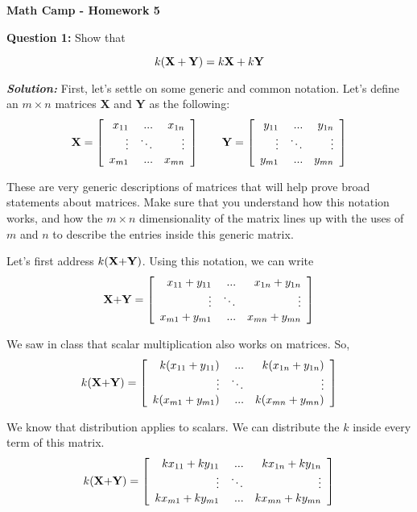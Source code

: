 \documentclass[12pt]{article}
\begin{document}
\centerline{\bf Math Camp - Homework 5}

\bigskip

\textbf{Question 1:} Show that

$$k(\textrm{\textbf{X}} + \textrm{\textbf{Y}}) = k\textrm{\textbf{X}} + k\textrm{\textbf{Y}}$$

\medskip

\textbf{\textit{Solution:}} First, let's settle on some generic and common notation. Let's define an $m\times n$ matrices \textbf{X} and \textbf{Y} as the following:
$$\textrm{\textbf{X}} = \left[\begin{array}{rrr}
x_{11} & ... & x_{1n}\\
\vdots & \ddots & \vdots\\
x_{m1} & ... & x_{mn}\end{array}\right] \qquad \textrm{\textbf{Y}} = \left[\begin{array}{rrr}
y_{11} & ... & y_{1n}\\
\vdots & \ddots & \vdots\\
y_{m1} & ... & y_{mn}\end{array}\right]$$

These are very generic descriptions of matrices that will help prove broad statements about matrices. Make sure that you understand how this notation works, and how the $m\times n$ dimensionality of the matrix lines up with the uses of $m$ and $n$ to describe the entries inside this generic matrix. 

Let's first address $k(\textrm{\textbf{X}+\textbf{Y}})$. Using this notation, we can write
$$\textrm{\textbf{X}+\textbf{Y}} = \left[\begin{array}{rrr}
x_{11}+y_{11} & ... & x_{1n}+y_{1n}\\
\vdots & \ddots & \vdots\\
x_{m1}+y_{m1} & ... & x_{mn}+y_{mn}\end{array}\right]$$

We saw in class that scalar multiplication also works on matrices. So,
$$k(\textrm{\textbf{X}+\textbf{Y}}) = \left[\begin{array}{rrr}
k(x_{11}+y_{11}) & ... & k(x_{1n}+y_{1n})\\
\vdots & \ddots & \vdots\\
k(x_{m1}+y_{m1}) & ... & k(x_{mn}+y_{mn})\end{array}\right]$$

We know that distribution applies to scalars. We can distribute the $k$ inside every term of this matrix.
$$k(\textrm{\textbf{X}+\textbf{Y}}) = \left[\begin{array}{rrr}
kx_{11}+ky_{11} & ... & kx_{1n}+ky_{1n}\\
\vdots & \ddots & \vdots\\
kx_{m1}+ky_{m1} & ... & kx_{mn}+ky_{mn}\end{array}\right]$$
\end{document}

